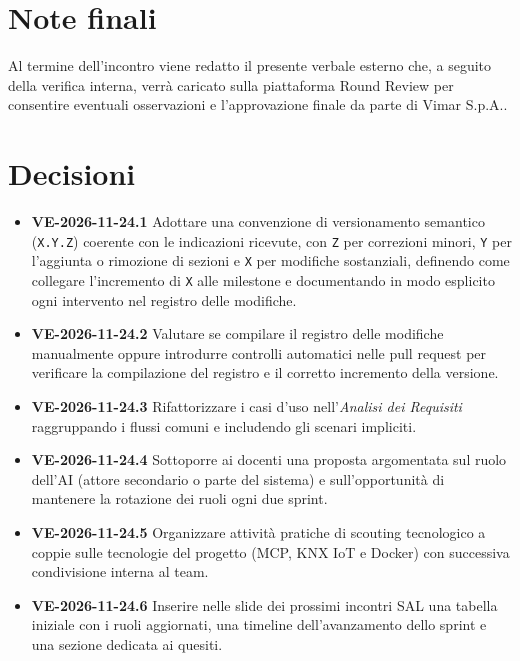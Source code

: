 \documentclass[11pt, a4paper]{article}
\begin{document}
\section{Note finali}
Al termine dell'incontro viene redatto il presente verbale esterno che, a seguito della verifica interna, verrà caricato sulla piattaforma Round Review per consentire eventuali osservazioni e l'approvazione finale da parte di Vimar S.p.A..

\section{Decisioni}
\begin{itemize}
    \item \textbf{VE-2026-11-24.1} Adottare una convenzione di versionamento semantico (\texttt{X.Y.Z}) coerente con le indicazioni ricevute, con \texttt{Z} per correzioni minori, \texttt{Y} per l'aggiunta o rimozione di sezioni e \texttt{X} per modifiche sostanziali, definendo come collegare l'incremento di \texttt{X} alle milestone e documentando in modo esplicito ogni intervento nel registro delle modifiche.

    \item \textbf{VE-2026-11-24.2} Valutare se compilare il registro delle modifiche manualmente oppure introdurre controlli automatici nelle pull request per verificare la compilazione del registro e il corretto incremento della versione.

    \item \textbf{VE-2026-11-24.3} Rifattorizzare i casi d'uso nell'\textit{Analisi dei Requisiti} raggruppando i flussi comuni e includendo gli scenari impliciti.

    \item \textbf{VE-2026-11-24.4} Sottoporre ai docenti una proposta argomentata sul ruolo dell'AI (attore secondario o parte del sistema) e sull'opportunità di mantenere la rotazione dei ruoli ogni due sprint.

    \item \textbf{VE-2026-11-24.5} Organizzare attività pratiche di scouting tecnologico a coppie sulle tecnologie del progetto (MCP, KNX IoT e Docker) con successiva condivisione interna al team.

    \item \textbf{VE-2026-11-24.6} Inserire nelle slide dei prossimi incontri SAL una tabella iniziale con i ruoli aggiornati, una timeline dell'avanzamento dello sprint e una sezione dedicata ai quesiti.
\end{itemize}
\end{document}
